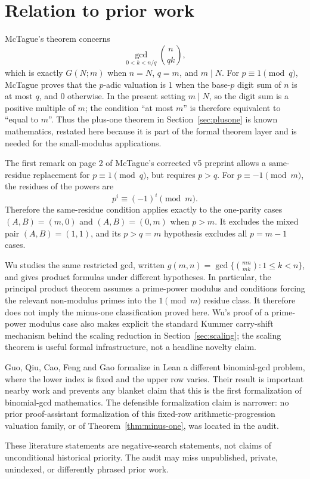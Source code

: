 \documentclass[11pt]{article}
\begin{document}
\section{Relation to prior work}\label{sec:literature}

McTague's theorem concerns
\[
  \gcd_{0<k<n/q}\binom n{qk},
\]
which is exactly $G(N;m)$ when $n=N$, $q=m$, and $m\mid N$.  For
$p\equiv 1\pmod q$, McTague proves that the $p$-adic valuation is $1$ when the
base-$p$ digit sum of $n$ is at most $q$, and $0$ otherwise.  In the present
setting $m\mid N$, so the digit sum is a positive multiple of $m$; the condition
``at most $m$'' is therefore equivalent to ``equal to $m$''.  Thus the plus-one
theorem in Section~\ref{sec:plusone} is known mathematics, restated here because
it is part of the formal theorem layer and is needed for the small-modulus
applications.

The first remark on page 2 of McTague's corrected v5 preprint allows a
same-residue replacement for $p\equiv 1\pmod q$, but requires $p>q$.  For
$p\equiv -1\pmod m$, the residues of the powers are
\[
  p^i\equiv (-1)^i\pmod m.
\]
Therefore the same-residue condition applies exactly to the one-parity cases
$(A,B)=(m,0)$ and $(A,B)=(0,m)$ when $p>m$.  It excludes the mixed pair
$(A,B)=(1,1)$, and its $p>q=m$ hypothesis excludes all $p=m-1$ cases.

Wu studies the same restricted gcd, written
$g(m,n)=\gcd\{\binom{mn}{mk}:1\leq k<n\}$, and gives product formulas under
different hypotheses.  In particular, the principal product theorem assumes a
prime-power modulus and conditions forcing the relevant non-modulus primes into
the $1\pmod m$ residue class.  It therefore does not imply the minus-one
classification proved here.  Wu's proof of a prime-power modulus case also
makes explicit the standard Kummer carry-shift mechanism behind the scaling
reduction in Section~\ref{sec:scaling}; the scaling theorem is useful formal
infrastructure, not a headline novelty claim.

Guo, Qiu, Cao, Feng and Gao formalize in Lean a different binomial-gcd problem,
where the lower index is fixed and the upper row varies.  Their result is
important nearby work and prevents any blanket claim that this is the first
formalization of binomial-gcd mathematics.  The defensible formalization claim
is narrower: no prior proof-assistant formalization of this fixed-row
arithmetic-progression valuation family, or of Theorem~\ref{thm:minus-one}, was
located in the audit.

These literature statements are negative-search statements, not claims of
unconditional historical priority.  The audit may miss unpublished, private,
unindexed, or differently phrased prior work.
\end{document}
